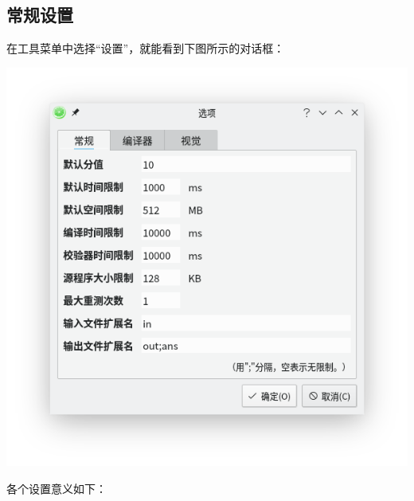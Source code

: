 \documentclass[UTF-8]{ctexart}
\begin{document}
			\subsection{常规设置}
			
				在工具菜单中选择“设置”，就能看到下图所示的对话框：
				
				\begin{center}
				\includegraphics[scale=0.7]{pics/generalsettings.png}
				\end{center}
			
				各个设置意义如下：
				
\end{document}
